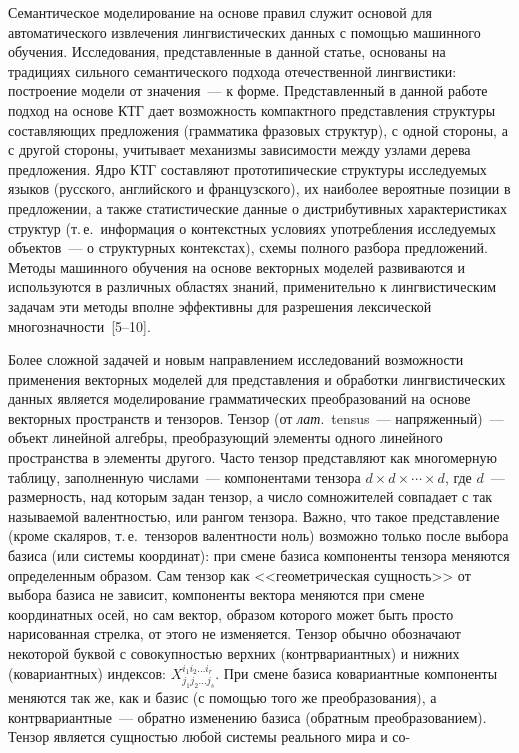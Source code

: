 \begin{multicols}{2}
  Семантическое моделирование на основе правил служит основой для 
автоматического извлечения лингвистических данных с помощью 
машинного обучения. Исследования, представленные в данной статье, 
основаны на традициях сильного семантического подхода отечественной 
лингвистики: построение модели от значения~--- к форме. Представленный в 
данной работе подход на основе КТГ 
дает возможность компактного представления структуры составляющих 
предложения (грамматика фразовых структур), с одной стороны, а с другой 
стороны, учитывает механизмы зависимости между узлами дерева 
предложения. Ядро КТГ составляют прототипические структуры 
исследуемых языков (русского, английского и французского), их наиболее 
вероятные позиции в предложении, а также статистические данные о 
дистрибутивных характеристиках структур (т.\,е.\ информация о контекстных 
условиях употребления исследуемых объектов~--- о структурных 
контекстах), схемы полного разбора предложений. Методы машинного 
обучения на основе векторных моделей развиваются и используются в 
различных областях знаний, применительно к лингвистическим задачам эти 
методы вполне эффективны для разрешения лексической 
  многозначности~[5--10]. 
  
  Более сложной задачей и новым направлением исследований возможности 
применения векторных моделей для представления и обработки 
лингвистических данных является моделирование грамматических 
преобразований на основе векторных пространств и тензоров. Тензор (от 
\textit{лат}.\ tensus~--- напряженный)~--- объект линейной алгебры, преобразующий 
элементы одного линейного пространства в элементы другого. Часто тензор 
представляют как многомерную таблицу, заполненную числами~--- 
компонентами тензора $d\times d\times\cdots \times d$, где $d$~--- размерность, 
над которым задан тензор, а число сомножителей совпадает с так называемой 
валентностью, или рангом тензора. Важно, что такое представление (кроме 
скаляров, т.\,е.\ тензоров валентности ноль) возможно только после выбора 
базиса (или системы координат): при смене базиса компоненты тензора 
меняются определенным образом. Сам тензор как <<геометрическая 
сущность>> от выбора базиса не зависит, компоненты вектора меняются при 
смене координатных осей, но сам вектор, образом которого может быть 
прос\-то нарисованная стрелка, от этого не изменяется. Тензор обычно 
обозначают некоторой буквой с совокупностью верхних (контрвариантных) и 
нижних (ковариантных) индексов: $X^{i_1i_2\ldots i_r}_{j_1j_2\ldots j_s}$. 
При смене базиса ковариантные компоненты меняются так же, как и базис (с 
помощью того же преобразования), а контрвариантные~--- обратно 
изменению базиса (обратным преобразованием). Тензор является сущностью 
любой системы реального мира и со-\linebreak\vspace*{-12pt}


\end{multicols}
